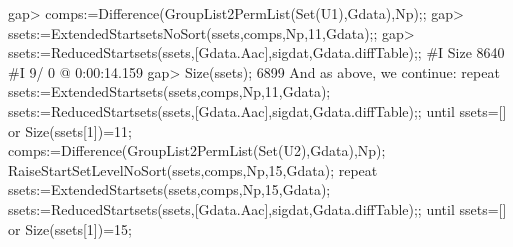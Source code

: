 \beginexample
gap> comps:=Difference(GroupList2PermList(Set(U1),Gdata),Np);;
gap> ssets:=ExtendedStartsetsNoSort(ssets,comps,Np,11,Gdata);;
gap> ssets:=ReducedStartsets(ssets,[Gdata.Aac],sigdat,Gdata.diffTable);; 
#I  Size 8640
#I  9/ 0 @ 0:00:14.159
gap> Size(ssets);  
6899
\endexample
%
And as above, we continue:
%
\begintt
repeat 
    ssets:=ExtendedStartsets(ssets,comps,Np,11,Gdata); 
    ssets:=ReducedStartsets(ssets,[Gdata.Aac],sigdat,Gdata.diffTable);; 
until ssets=[] or Size(ssets[1])=11; 
comps:=Difference(GroupList2PermList(Set(U2),Gdata),Np); 
RaiseStartSetLevelNoSort(ssets,comps,Np,15,Gdata); 
repeat 
    ssets:=ExtendedStartsets(ssets,comps,Np,15,Gdata); 
    ssets:=ReducedStartsets(ssets,[Gdata.Aac],sigdat,Gdata.diffTable);; 
until ssets=[] or Size(ssets[1])=15; 
\endtt


